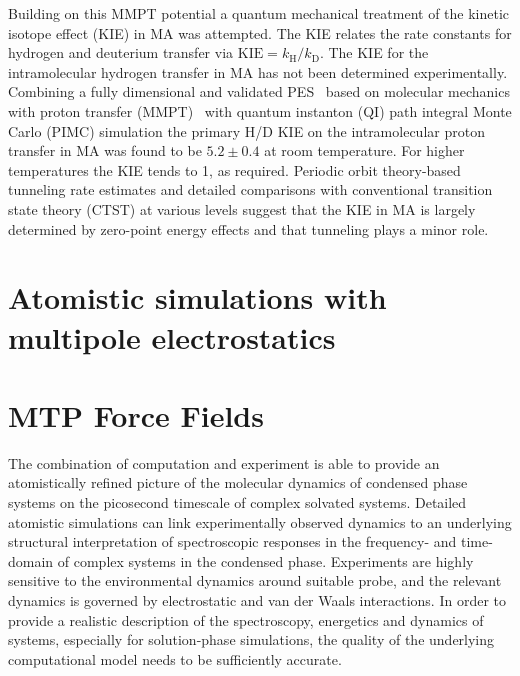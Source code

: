 \documentclass[journal=jacsat,manuscript=article]{achemso}
\begin{document}
\noindent
Building on this MMPT potential a quantum mechanical treatment of the
kinetic isotope effect (KIE) in MA was attempted. The KIE relates the
rate constants for hydrogen and deuterium transfer via
$\mathrm{KIE}=k_{\mathrm{H}}/k_{\mathrm{D}}$. The KIE for the
intramolecular hydrogen transfer in MA has not been determined
experimentally. Combining a fully dimensional and validated
PES~\cite{MM10ma} based on molecular mechanics with proton transfer
(MMPT)~\cite{lammersmeuwly.jcc.2008.mmpt} with quantum instanton
(QI)\cite{miller03,voth10ma} path integral Monte Carlo (PIMC)
simulation the primary H/D KIE on the intramolecular proton transfer
in MA was found to be $5.2 \pm 0.4$ at room temperature.\cite{MM14ma}
For higher temperatures the KIE tends to 1, as required. Periodic
orbit theory-based tunneling rate estimates and detailed comparisons
with conventional transition state theory (CTST) at various levels
suggest that the KIE in MA is largely determined by zero-point energy
effects and that tunneling plays a minor role.\\



\section{Atomistic simulations with multipole electrostatics}
    
\section{MTP Force Fields}
\noindent
The combination of computation and experiment is able to provide an
atomistically refined picture of the molecular dynamics of condensed
phase systems on the picosecond timescale of complex solvated
systems. Detailed atomistic simulations can link experimentally
observed dynamics to an underlying structural interpretation of
spectroscopic responses in the frequency- and time-domain of complex
systems in the condensed phase. Experiments are highly sensitive to
the environmental dynamics around suitable probe, and the relevant
dynamics is governed by electrostatic and van der Waals
interactions. In order to provide a realistic description of the
spectroscopy, energetics and dynamics of systems, especially for
solution-phase simulations, the quality of the underlying
computational model needs to be sufficiently accurate.
\end{document}
